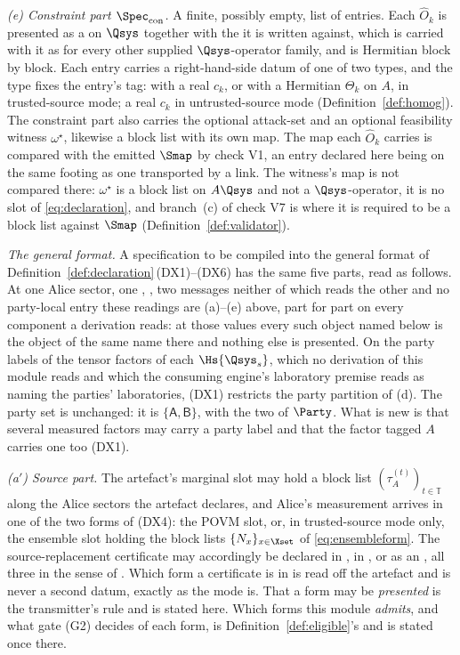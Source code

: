 \begin{definition}
\emph{(e) Constraint part $\Spec_{\mathrm{con}}$.} A finite, possibly empty,
list of entries. Each $\hat O_k$ is presented as a  on
$\Qsys$ together with the  it is written against, which is
carried with it as for every other supplied $\Qsys$-operator family, and is
Hermitian block by block. Each entry carries a right-hand-side datum of one of
two types, and the type fixes the entry's tag:  with a real
$c_k$, or  with a Hermitian $\Theta_k$ on $A$, in trusted-source
mode; a real $c_k$ in untrusted-source mode (Definition~\ref{def:homog}). The
constraint part also carries the optional attack-set  and an
optional feasibility witness $\omega^{\star}$, likewise a block list with its
own map. The map each $\hat O_k$ carries is compared with the emitted $\Smap$
by check V1, an entry declared here being on the same footing as one
transported by a link. The witness's map is not compared there: $\omega^{\star}$
is a block list on $A\Qsys$ and not a $\Qsys$-operator, it is no slot of
\eqref{eq:declaration}, and branch~(c) of check V7 is where it is required to
be a block list against $\Smap$ (Definition~\ref{def:validator}).

\emph{The general format.} A specification to be compiled into the general
format of Definition~\ref{def:declaration}\,(DX1)--(DX6) has the same five
parts, read as follows. At one Alice sector, one ,
, two messages neither of which reads the other and no
party-local entry these readings are (a)--(e) above, part for part on every
component a derivation reads: at those values every such object named below
is the object of the same name there and nothing else is presented. On the
party labels of the tensor factors of each $\Hs{\Qsys_s}$, which no
derivation of this module reads and which the consuming engine's laboratory
premise reads as naming the parties' laboratories, (DX1) restricts the party
partition of (d). The party set is unchanged: it is
$\{\mathsf A,\mathsf B\}$, with the two  of $\Party$. What
is new is that several measured factors may carry a party label and that the
factor tagged $A$ carries one too (DX1).

\emph{(a$'$) Source part.} The artefact's marginal slot may hold a block list
$(\tau^{(t)}_A)_{t\in\mathbb{T}}$ along the Alice sectors the artefact
declares, and Alice's measurement arrives in one of the two forms of (DX4):
the POVM slot, or, in trusted-source mode only, the ensemble slot holding the
block lists $\{N_x\}_{x\in\Xset}$ of \eqref{eq:ensembleform}. The
source-replacement certificate may accordingly be declared in
, in , or as an
, all three in the sense of
. Which form a certificate is in is read off the
artefact and is never a second datum, exactly as the mode is. That a form may
be \emph{presented} is the transmitter's rule and is stated here. Which forms
this module \emph{admits}, and what gate (G2) decides of each form, is
Definition~\ref{def:eligible}'s and is stated once there.


\end{definition}

